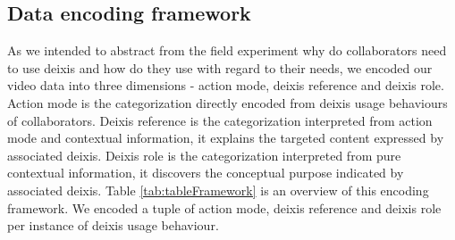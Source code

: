 \documentclass[12pt,twoside]{article}
\begin{document}
\subsection{Data encoding framework}
\label{sect:framework}
As we intended to abstract from the field experiment why do collaborators need to use deixis and how do they use with regard to their needs, we encoded our video data into three dimensions - action mode, deixis reference and deixis role. Action mode is the categorization directly encoded from deixis usage behaviours of collaborators. Deixis reference is the categorization interpreted from action mode and contextual information, it explains the targeted content expressed by associated deixis. Deixis role is the categorization interpreted from pure contextual information, it discovers the conceptual purpose indicated by associated deixis. Table \ref{tab:tableFramework} is an overview of this encoding framework. We encoded a tuple of action mode, deixis reference and deixis role per instance of deixis usage behaviour.
\end{document}
